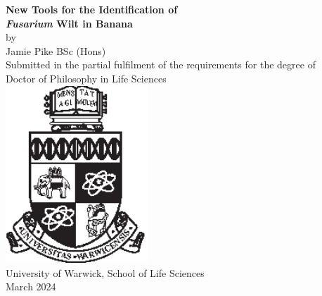 \begin{titlepage}
    \begin{center}
        \singlespacing
        \Huge
        \textbf{New Tools for the Identification of} \\\vspace*{0.5cm} \textbf{\textit{Fusarium} Wilt in Banana} \\
        \vspace*{1.75cm}
        \normalsize
        by \\ 
        \vspace*{0.2cm}
        \LARGE
        Jamie Pike BSc (Hons) \\ 
        \vfill
        \normalsize
        Submitted in the partial fulfilment of the requirements for the degree of \\
        \Large
        \vspace*{0.3cm}
        Doctor of Philosophy in Life Sciences \\
        \vspace*{1cm}
        \includegraphics[width=0.4\textwidth]{Preamble/crest_black.eps} \\
        \vspace*{1cm}
        \large
        University of Warwick, School of Life Sciences\\
        \vspace*{0.5cm}
        \normalsize
        March 2024 \\
         \vspace*{1cm}   
    \end{center}
    \clearpage
\end{titlepage}